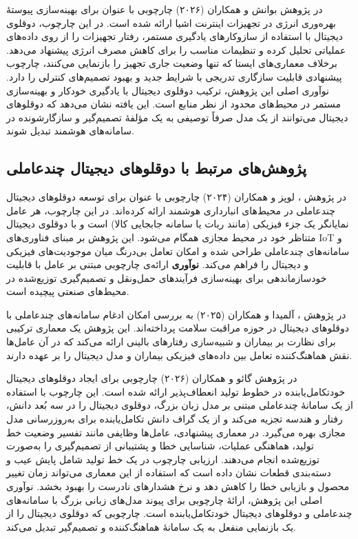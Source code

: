 در پژوهش
بوانش و همکاران (۲۰۲۶)
\cite{bhuvanesh2026selflearningdt}
چارچوبی با عنوان
برای بهینه‌سازی پیوستهٔ بهره‌وری انرژی در تجهیزات اینترنت اشیا ارائه شده است. در این چارچوب، دوقلوی دیجیتال با استفاده از سازوکارهای یادگیری مستمر، رفتار تجهیزات را از روی داده‌های عملیاتی تحلیل کرده و تنظیمات مناسب را برای کاهش مصرف انرژی پیشنهاد می‌دهد. برخلاف معماری‌های ایستا که تنها وضعیت جاری تجهیز را بازنمایی می‌کنند، چارچوب پیشنهادی قابلیت سازگاری تدریجی با شرایط جدید و بهبود تصمیم‌های کنترلی را دارد. نوآوری اصلی این پژوهش، ترکیب دوقلوی دیجیتال با یادگیری خودکار و بهینه‌سازی مستمر در محیط‌های محدود از نظر منابع است. این یافته نشان می‌دهد که دوقلوهای دیجیتال می‌توانند از یک مدل صرفاً توصیفی به یک مؤلفهٔ تصمیم‌گیر و سازگارشونده در سامانه‌های هوشمند تبدیل شوند.



\subsection{پژوهش‌های مرتبط با دوقلوهای دیجیتال چندعاملی}

در پژوهش \cite{lopez2024madtwin}، 
لوپز و همکاران (۲۰۲۴)
چارچوبی با عنوان  برای توسعه دوقلوهای دیجیتال چندعاملی در محیط‌های انبارداری هوشمند ارائه کرده‌اند. در این چارچوب، هر عامل نمایانگر یک جزء فیزیکی (مانند ربات یا سامانه جابجایی کالا) است و با دوقلوی دیجیتال متناظر خود در محیط مجازی همگام می‌شود. این پژوهش بر مبنای فناوری‌های 
 \gls{IoT}
  و سامانه‌های چندعاملی طراحی شده و امکان تعامل بی‌درنگ میان موجودیت‌های فیزیکی و دیجیتال را فراهم می‌کند. \textbf{نوآوری} ارائه‌ی چارچوبی مبتنی بر عامل با قابلیت خودسازماندهی برای بهینه‌سازی فرآیندهای حمل‌ونقل و تصمیم‌گیری توزیع‌شده در محیط‌های صنعتی پیچیده است.

در پژوهش \cite{almeida2025healthagentsdt}، 
آلمیدا و همکاران (۲۰۲۵)
 به بررسی امکان ادغام سامانه‌های چندعاملی با دوقلوهای دیجیتال در حوزه مراقبت سلامت پرداخته‌اند. این پژوهش یک معماری ترکیبی برای نظارت بر بیماران و شبیه‌سازی رفتارهای بالینی ارائه می‌کند که در آن عامل‌ها نقش هماهنگ‌کننده تعامل بین داده‌های فیزیکی بیماران و مدل دیجیتال را بر عهده دارند. 


در پژوهش
گائو و همکاران (۲۰۲۶)
\cite{gao2026selfevolving}
چارچوبی برای ایجاد دوقلوهای دیجیتال خودتکامل‌یابنده در خطوط تولید انعطاف‌پذیر ارائه شده است. این چارچوب با استفاده از یک سامانهٔ چندعاملی مبتنی بر مدل زبان بزرگ، دوقلوی دیجیتال را در سه بُعد دانش، رفتار و هندسه تجزیه می‌کند و از یک گراف دانش تکامل‌یابنده برای به‌روزرسانی مدل مجازی بهره می‌گیرد. در معماری پیشنهادی، عامل‌ها وظایفی مانند تفسیر وضعیت خط تولید، هماهنگی عملیات، شناسایی خطا و پشتیبانی از تصمیم‌گیری را به‌صورت توزیع‌شده انجام می‌دهند. ارزیابی چارچوب در یک خط تولید شامل پایش عیب و دسته‌بندی قطعات نشان داده است که استفاده از این معماری می‌تواند زمان تغییر محصول و بازیابی خطا را کاهش دهد و نرخ هشدارهای نادرست را بهبود بخشد. نوآوری اصلی این پژوهش، ارائهٔ چارچوبی برای پیوند مدل‌های زبانی بزرگ با سامانه‌های چندعاملی و دوقلوهای دیجیتال خودتکامل‌یابنده است. چارچوبی که دوقلوی دیجیتال را از یک بازنمایی منفعل به یک سامانهٔ هماهنگ‌کننده و تصمیم‌گیر تبدیل می‌کند.



